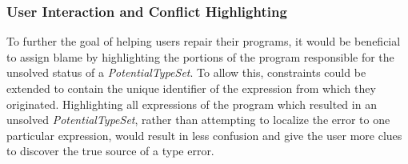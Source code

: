 
\subsubsection{User Interaction and Conflict Highlighting}
To further the goal of helping users repair their programs, it would be beneficial to assign blame by highlighting the portions of the program responsible for the unsolved status of a \textit{PotentialTypeSet}. To allow this, constraints could be extended to contain the unique identifier of the expression from which they originated. Highlighting all expressions of the program which resulted in an unsolved \textit{PotentialTypeSet}, rather than attempting to localize the error to one particular expression, would result in less confusion and give the user more clues to discover the true source of a type error.




